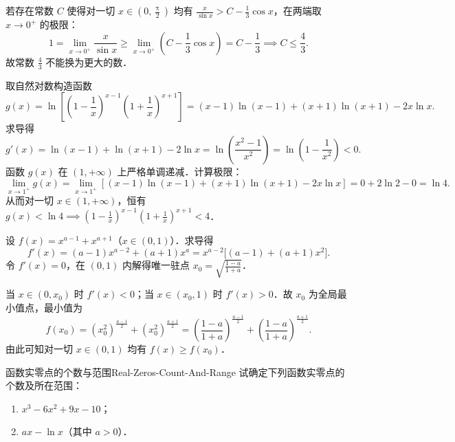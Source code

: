 \begin{myproof}
    若存在常数 $C$ 使得对一切 $x \in \left(0, \frac{\uppi}{2}\right)$ 均有 $\frac{x}{\sin x} > C - \frac{1}{3}\cos x$，在两端取 $x \to 0^+$ 的极限：
    \begin{equation}
        1 = \lim_{x\to 0^+} \frac{x}{\sin x} \geqslant \lim_{x\to 0^+} \left( C - \frac{1}{3}\cos x \right) = C - \frac{1}{3} \implies C \leqslant \frac{4}{3}.
    \end{equation}
    故常数 $\frac{4}{3}$ 不能换为更大的数．


    取自然对数构造函数
    \begin{equation}
        g(x) = \ln\left[ \left(1 - \frac{1}{x}\right)^{x-1}\left(1 + \frac{1}{x}\right)^{x+1} \right] = (x-1)\ln(x-1) + (x+1)\ln(x+1) - 2x\ln x.
    \end{equation}
    求导得
    \begin{equation}
        g'(x) = \ln(x-1) + \ln(x+1) - 2\ln x = \ln\left( \frac{x^2-1}{x^2} \right) = \ln\left( 1 - \frac{1}{x^2} \right) < 0.
    \end{equation}
    函数 $g(x)$ 在 $(1, +\infty)$ 上严格单调递减．计算极限：
    \begin{equation}
        \lim_{x\to 1^+} g(x) = \lim_{x\to 1^+} \left[ (x-1)\ln(x-1) + (x+1)\ln(x+1) - 2x\ln x \right] = 0 + 2\ln 2 - 0 = \ln 4.
    \end{equation}
    从而对一切 $x \in (1, +\infty)$，恒有 $g(x) < \ln 4 \implies \left(1 - \frac{1}{x}\right)^{x-1}\left(1 + \frac{1}{x}\right)^{x+1} < 4$．


    设 $f(x) = x^{a-1} + x^{a+1}$（$x \in (0, 1)$）．求导得
    \begin{equation}
        f'(x) = (a-1)x^{a-2} + (a+1)x^a = x^{a-2}\bigl[ (a-1) + (a+1)x^2 \bigr].
    \end{equation}
    令 $f'(x) = 0$，在 $(0, 1)$ 内解得唯一驻点 $x_0 = \sqrt{\frac{1-a}{1+a}}$．

    当 $x \in (0, x_0)$ 时 $f'(x) < 0$；当 $x \in (x_0, 1)$ 时 $f'(x) > 0$．故 $x_0$ 为全局最小值点，最小值为
    \begin{equation}
        f(x_0) = (x_0^2)^{\frac{a-1}{2}} + (x_0^2)^{\frac{a+1}{2}} = \left(\frac{1-a}{1+a}\right)^{\frac{a-1}{2}} + \left(\frac{1-a}{1+a}\right)^{\frac{a+1}{2}}.
    \end{equation}
    由此可知对一切 $x \in (0, 1)$ 均有 $f(x) \geqslant f(x_0)$．
\end{myproof}

\begin{problem}{函数实零点的个数与范围}{Real-Zeros-Count-And-Range}
    试确定下列函数实零点的个数及所在范围：
    \begin{enumerate}
        \item $x^3 - 6x^2 + 9x - 10$；
        \item $ax - \ln x$（其中 $a > 0$）．
    \end{enumerate}
\end{problem}

